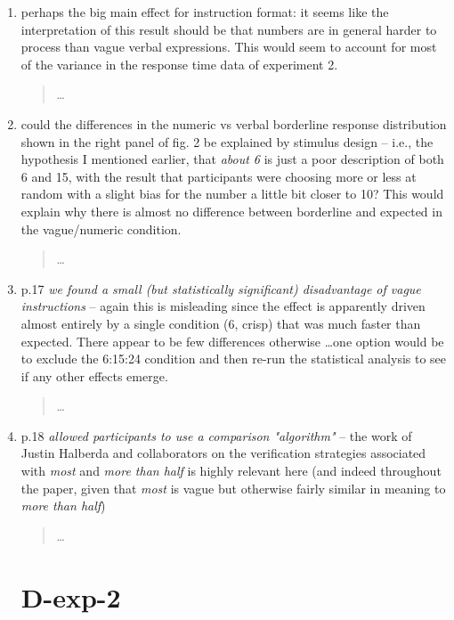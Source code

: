 \documentclass{tufte-handout}
\begin{document}
\begin{enumerate}
\item perhaps the big main effect for instruction format: it seems like the interpretation of this result should be that numbers are in general harder to process than vague verbal expressions. This would seem to account for most of the variance in the response time data of experiment 2.
\begin{quote}\ldots\end{quote}

\item could the differences in the numeric vs verbal borderline response distribution shown in the right panel of fig. 2 be explained by stimulus design -- i.e., the hypothesis I mentioned earlier, that \emph{about 6} is just a poor description of both 6 and 15, with the result that participants were choosing more or less at random with a slight bias for the number a little bit closer to 10? This would explain why there is almost no difference between borderline and expected in the vague/numeric condition.
\begin{quote}\ldots\end{quote}

\item p.17 \emph{we found a small (but statistically significant) disadvantage of vague instructions} -- again this is misleading since the effect is apparently driven almost entirely by a single condition (6, crisp) that was much faster than expected. There appear to be few differences otherwise \ldots one option would be to exclude the 6:15:24 condition and then re-run the statistical analysis to see if any other effects emerge.
\begin{quote}\ldots\end{quote}

\item p.18 \emph{allowed participants to use a comparison "algorithm"} -- the work of Justin Halberda and collaborators on the verification strategies associated with \emph{most} and \emph{more than half} is highly relevant here (and indeed throughout the paper, given that \emph{most} is vague but otherwise fairly similar in meaning to \emph{more than half})
\begin{quote}\ldots\end{quote}

\section{D-exp-2}


\end{enumerate}
\end{document}
